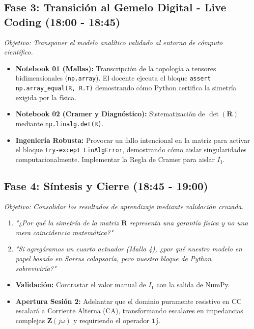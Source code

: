 \documentclass[11pt,a4paper]{article}
\begin{document}
\subsection*{Fase 3: Transición al Gemelo Digital - Live Coding (18:00 - 18:45)}
\textit{Objetivo: Transponer el modelo analítico validado al entorno de cómputo científico.}
\begin{itemize}
    \item \textbf{Notebook 01 (Mallas):} Transcripción de la topología a tensores bidimensionales (\texttt{np.array}). El docente ejecuta el bloque \texttt{assert np.array\_equal(R, R.T)} demostrando cómo Python certifica la simetría exigida por la física.
    \item \textbf{Notebook 02 (Cramer y Diagnóstico):} Sistematización de $\det(\mathbf{R})$ mediante \texttt{np.linalg.det(R)}. 
    \item \textbf{Ingeniería Robusta:} Provocar un fallo intencional en la matriz para activar el bloque \texttt{try-except LinAlgError}, demostrando cómo aislar singularidades computacionalmente. Implementar la Regla de Cramer para aislar $I_1$.
\end{itemize}

\subsection*{Fase 4: Síntesis y Cierre (18:45 - 19:00)}
\textit{Objetivo: Consolidar los resultados de aprendizaje mediante validación cruzada.}
\begin{tcolorbox}[colback=white,colframe=UCBgray,title=\textbf{Preguntas Socráticas de Cierre}]
\begin{enumerate}
    \item \textit{"¿Por qué la simetría de la matriz $\mathbf{R}$ representa una garantía física y no una mera coincidencia matemática?"}
    \item \textit{"Si agregáramos un cuarto actuador (Malla 4), ¿por qué nuestro modelo en papel basado en Sarrus colapsaría, pero nuestro bloque de Python sobreviviría?"}
\end{enumerate}
\end{tcolorbox}
\begin{itemize}
    \item \textbf{Validación:} Contrastar el valor manual de $I_1$ con la salida de NumPy.
    \item \textbf{Apertura Sesión 2:} Adelantar que el dominio puramente resistivo en CC escalará a Corriente Alterna (CA), transformando escalares en impedancias complejas $\mathbf{Z}(j\omega)$ y requiriendo el operador \texttt{1j}.
\end{itemize}
\end{document}
